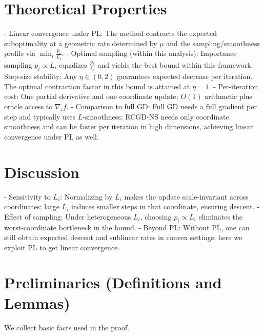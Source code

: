 \documentclass[11pt]{article}
\begin{document}
\section*{Theoretical Properties}
- Linear convergence under PL: The method contracts the expected suboptimality at a geometric rate determined by $\mu$ and the sampling/smoothness profile via $\min_i \frac{p_i}{L_i}$.
- Optimal sampling (within this analysis): Importance sampling $p_i\propto L_i$ equalizes $\frac{p_i}{L_i}$ and yields the best bound within this framework.
- Step-size stability: Any $\eta\in(0,2)$ guarantees expected decrease per iteration. The optimal contraction factor in this bound is attained at $\eta=1$.
- Per-iteration cost: One partial derivative and one coordinate update; $O(1)$ arithmetic plus oracle access to $\nabla_i f$.
- Comparison to full GD: Full GD needs a full gradient per step and typically uses $L$-smoothness; RCGD-NS needs only coordinate smoothness and can be faster per iteration in high dimensions, achieving linear convergence under PL as well.

\section*{Discussion}
- Sensitivity to $L_i$: Normalizing by $L_i$ makes the update scale-invariant across coordinates; large $L_i$ induces smaller steps in that coordinate, ensuring descent.
- Effect of sampling: Under heterogeneous $L_i$, choosing $p_i\propto L_i$ eliminates the worst-coordinate bottleneck in the bound.
- Beyond PL: Without PL, one can still obtain expected descent and sublinear rates in convex settings; here we exploit PL to get linear convergence.

\section*{Preliminaries (Definitions and Lemmas)}
We collect basic facts used in the proof.
\end{document}
